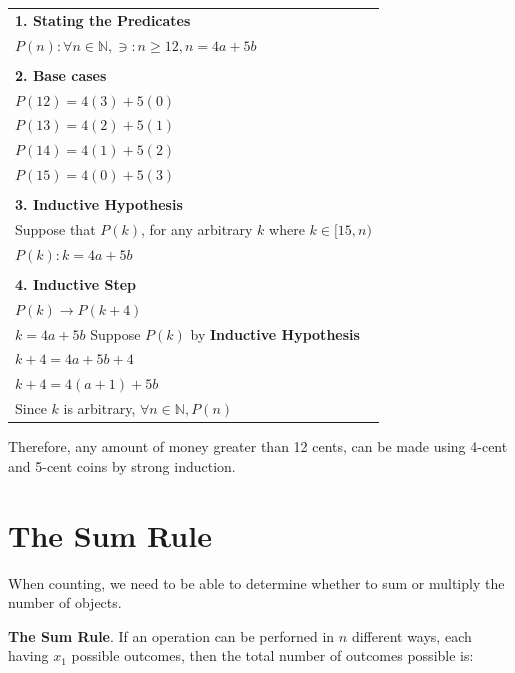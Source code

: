 \documentclass{article}
\begin{document}
\begin{center}
\begin{tabular}{l}
\textbf{1. Stating the Predicates}\\
$P(n): \forall n \in \mathbb N, \ni: n \geq 12, n = 4a + 5b$\\

 \\

\textbf{2. Base cases}\\
$P(12) = 4(3) + 5(0)$\\
$P(13) = 4(2) + 5(1)$\\
$P(14) = 4(1) + 5(2)$\\
$P(15) = 4(0) + 5(3)$\\

 \\

\textbf{3. Inductive Hypothesis}\\
Suppose that $P(k)$, for any arbitrary $k$ where $k \in [15, n)$\\
$P(k): k = 4a + 5b$\\

 \\

\textbf{4. Inductive Step}\\
$P(k) \rightarrow P(k+4)$\\
$k = 4a + 5b$ Suppose $P(k)$ by \textbf{Inductive Hypothesis}\\
$k + 4 = 4a + 5b + 4$\\
$k + 4 = 4(a + 1) + 5b$\\
Since $k$ is arbitrary, $\forall n\in \mathbb N, P(n)$
\end{tabular}

\end{center}

Therefore, any amount of money greater than 12 cents, can be made using 4-cent and 5-cent coins by strong induction.


\pagebreak

\text{}

\section{The Sum Rule}

When counting, we need to be able to determine whether to sum or multiply the number of objects.

\textbf{The Sum Rule}. If an operation can be perforned in $n$ different ways, each having $x_1$ possible outcomes, then the total number of outcomes possible is:
\end{document}
